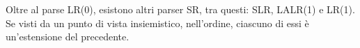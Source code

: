 \documentclass{subfiles}
\begin{document}
Oltre al parse LR(0), esistono altri parser SR, tra questi: SLR, LALR(1) e LR(1).
Se visti da un punto di vista insiemistico, nell'ordine, ciascuno di essi è un'estensione del precedente.

% 

% 
\end{document}
